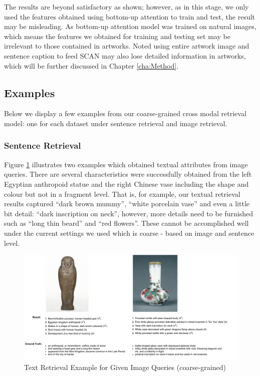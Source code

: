 The results are beyond satisfactory as shown; however, as in this stage, we only used the features obtained using bottom-up attention \cite{bottomup} to train and test, the result may be misleading. As bottom-up attention model was trained on natural images, which means the features we obtained for training and testing set may be irrelevant to those contained in artworks. Noted using entire artwork image and sentence caption to feed SCAN may also lose detailed information in artworks, which will be further discussed in Chapter \ref{cha:Method}.

\subsection{Examples}
Below we display a few examples from our coarse-grained cross modal retrieval model: one for each dataset under sentence retrieval and image retrieval.

\subsubsection{Sentence Retrieval}
Figure \ref{fig:scani2t} illustrates two examples which obtained textual attributes from image queries. There are several characteristics were successfully obtained from the left Egyptian anthropoid statue and the right Chinese vase including the shape and colour but not in a fragment level. That is, for example, our textual retrieval results captured ``dark brown mummy'', ``white porcelain vase'' and even a little bit detail: ``dark inscription on neck'', however, more details need to be furnished such as ``long thin beard'' and ``red flowers''. These cannot be accomplished well under the current settings we used which is coarse - based on image and sentence level.

\begin{figure}[h!]
\centering
\includegraphics[width=1\textwidth]{scani2t.pdf}
\caption{Text Retrieval Example for Given Image Queries (coarse-grained)}
\label{fig:scani2t}
\end{figure}

